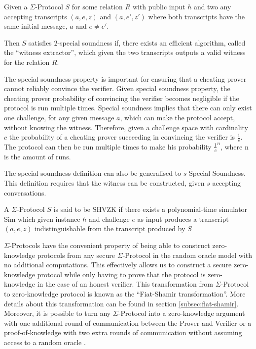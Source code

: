 \begin{definition}
Given a $\Sigma$-Protocol $S$ for some relation $R$ with public input $h$
and two any accepting transcripts $(a,e,z)$ and $(a,e',z')$
where both transcripts have the same initial message, $a$ and $e \neq e'$.

Then $S$ satisfies $2$-special soundness if, there exists an
efficient algorithm, called the ``witness extractor'',
which given the two transcripts outputs a valid witness for the relation $R$.
\end{definition}

The special soundness property is important for ensuring that a cheating prover
cannot reliably convince the verifier.
Given special soundness property, the cheating prover probability of convincing
the verifier becomes negligible if the protocol is run multiple times.
Special soundness implies that there can
only exist one challenge, for any given message $a$, which can make the
protocol accept, without knowing the witness. Therefore, given a challenge space
with cardinality $c$ the probability of a cheating prover succeeding in
convincing the verifier is $\frac{1}{c}$. The protocol can then be run multiple
times to make his probability $\frac{1}{c}^{n}$, where n is the amount of runs.

The special soundness definition can also be generalised to $s$-Special
Soundness. This definition requires that the witness can be constructed, given
$s$ accepting conversations.

\begin{definition}
  A $\Sigma$-Protocol $S$ is said to be SHVZK if there exists a polynomial-time
  simulator Sim which given instance $h$ and challenge $e$ as input produces a
  transcript $(a,e,z)$ indistinguishable from the transcript produced by $S$
\end{definition}

$\Sigma$-Protocols have the convenient property of being able to construct
zero-knowledge protocols from any secure $\Sigma$-Protocol in the random oracle
model with no additional computations. This effectively allows us to construct a
secure zero-knowledge protocol while only having to prove that the protocol is
zero-knowledge in the case of an honest verifier. This transformation from
$\Sigma$-Protocol to zero-knowledge protocol is known as the ``Fiat-Shamir
transformation''. More details about this transformation can be found in section
\ref{subsec:fiat-shamir}.
Moreover, it is possible to turn any $\Sigma$-Protocol into a zero-knowledge
argument with one additional round of communication between the Prover and
Verifier or a proof-of-knowledge with two extra rounds of communication without
assuming access to a random oracle \cite{on-sigma-protocols}.


